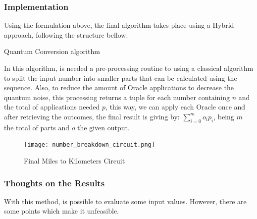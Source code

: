 \documentclass{article}
\begin{document}
\subsubsection{Implementation}

Using the formulation above, the final algorithm takes place using a Hybrid approach, following the structure bellow:

\begin{algorithm}[h]
	\begin{algorithmic}
		\EndFor
			
	\end{algorithmic}
	\caption{Quantum Conversion algorithm}
	\label{alg:miles-to-km-quantum-algortihm}
\end{algorithm}

In this algorithm, is needed a pre-processing routine to using a classical algorithm to split the input number into smaller parts that can be calculated using the sequence. Also, to reduce the amount of Oracle applications to decrease the quantum noise, this processing returns a tuple for each number containing $n$ and the total of applications needed $p$, this way, we can apply each Oracle once and after retrieving the outcomes, the final result is giving by: $\sum_{i=0}^{m} {o_{i}p_{i}}$, being $m$ the total of parts and $o$ the given output.


\begin{figure}[h]
	\centering
	\texttt{[image: number\_breakdown\_circuit.png]}
	\caption{Final Miles to Kilometers Circuit}
	\label{fig:miles-km-circuit}
\end{figure}


\subsubsection{Thoughts on the Results}

With this method, is possible to evaluate some input values. However, there are some points which make it unfeasible.
\end{document}
